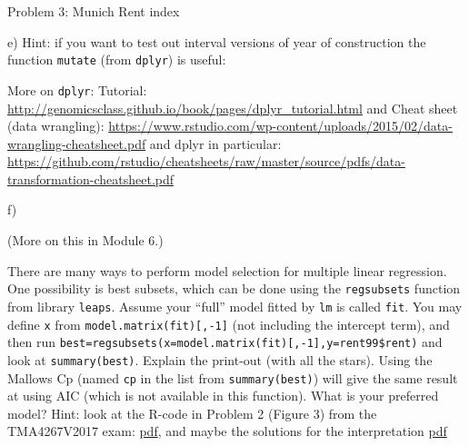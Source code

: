 \documentclass[ignorenonframetext,]{beamer}
\newenvironment{Shaded}{\begin{snugshade}}{\end{snugshade}}
\newcommand{\KeywordTok}[1]{\textcolor[rgb]{0.13,0.29,0.53}{\textbf{#1}}}
\newcommand{\DataTypeTok}[1]{\textcolor[rgb]{0.13,0.29,0.53}{#1}}
\newcommand{\DecValTok}[1]{\textcolor[rgb]{0.00,0.00,0.81}{#1}}
\newcommand{\StringTok}[1]{\textcolor[rgb]{0.31,0.60,0.02}{#1}}
\newcommand{\OtherTok}[1]{\textcolor[rgb]{0.56,0.35,0.01}{#1}}
\newcommand{\OperatorTok}[1]{\textcolor[rgb]{0.81,0.36,0.00}{\textbf{#1}}}
\newcommand{\NormalTok}[1]{#1}
\begin{document}
\begin{frame}[fragile]
\begin{block}{Problem 3: Munich Rent index}
\begin{block}{e)}
Hint: if you want to test out interval versions of year of construction
the function \texttt{mutate} (from \texttt{dplyr}) is useful:

\begin{Shaded}
\end{Shaded}

More on \texttt{dplyr}: Tutorial:
\url{http://genomicsclass.github.io/book/pages/dplyr_tutorial.html} and
Cheat sheet (data wrangling):
\url{https://www.rstudio.com/wp-content/uploads/2015/02/data-wrangling-cheatsheet.pdf}
and dplyr in particular:
\url{https://github.com/rstudio/cheatsheets/raw/master/source/pdfs/data-transformation-cheatsheet.pdf}

\end{block}

\begin{block}{f)}

(More on this in Module 6.)

There are many ways to perform model selection for multiple linear
regression. One possibility is best subsets, which can be done using the
\texttt{regsubsets} function from library \texttt{leaps}. Assume your
``full'' model fitted by \texttt{lm} is called \texttt{fit}. You may
define \texttt{x} from \texttt{model.matrix(fit){[},-1{]}} (not
including the intercept term), and then run
\texttt{best=regsubsets(x=model.matrix(fit){[},-1{]},y=rent99\$rent)}
and look at \texttt{summary(best)}. Explain the print-out (with all the
stars). Using the Mallows Cp (named \texttt{cp} in the list from
\texttt{summary(best)}) will give the same result at using AIC (which is
not available in this function). What is your preferred model? Hint:
look at the R-code in Problem 2 (Figure 3) from the TMA4267V2017 exam:
\href{https://www.math.ntnu.no/emner/TMA4267/2017v/Exam/eV2017Enew.pdf}{pdf},
and maybe the solutions for the interpretation
\href{https://www.math.ntnu.no/emner/TMA4267/2017v/Exam/mergedLFV2017.pdf}{pdf}

\end{block}

\end{block}

\end{frame}
\end{document}
